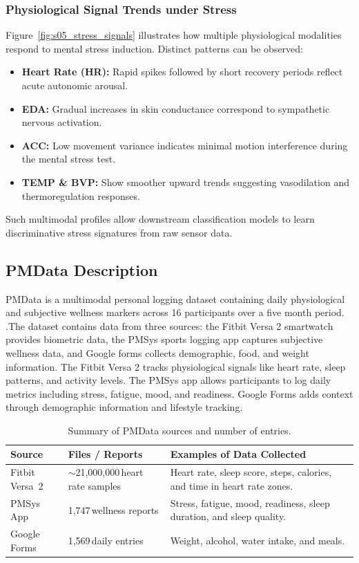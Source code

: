 \documentclass[12pt,letterpaper]{article}
\begin{document}
\subsubsection{Physiological Signal Trends under Stress}
Figure~\ref{fig:s05_stress_signals} illustrates how multiple physiological modalities respond to mental stress induction.
Distinct patterns can be observed:
\begin{itemize}
    \item \textbf{Heart Rate (HR):} Rapid spikes followed by short recovery periods reflect acute autonomic arousal.
    \item \textbf{EDA:} Gradual increases in skin conductance correspond to sympathetic nervous activation.
    \item \textbf{ACC:} Low movement variance indicates minimal motion interference during the mental stress test.
    \item \textbf{TEMP \& BVP:} Show smoother upward trends suggesting vasodilation and thermoregulation responses.
\end{itemize}
Such multimodal profiles allow downstream classification models to learn discriminative stress signatures from raw sensor data.






\subsection{PMData Description}
PMData is a multimodal personal logging dataset containing daily physiological and subjective wellness markers across 16 participants over a five month period. \citep{thambawita2020pmdata}.The dataset contains data from three sources: the Fitbit Versa 2 smartwatch provides biometric data, the PMSys sports logging app captures subjective wellness data, and Google forms collects demographic, food, and weight information. The Fitbit Versa 2 tracks physiological signals like heart rate, sleep patterns, and activity levels. The PMSys app allows participants to log daily metrics including stress, fatigue, mood, and readiness. Google Forms adds context through demographic information and lifestyle tracking. 

\begin{table}[H]
\centering
\renewcommand{\arraystretch}{1.2} 
\setlength{\tabcolsep}{6pt} 
\caption{Summary of PMData sources and number of entries.}
\label{tab:pmdata-summary}
\begin{tabular}{p{3.5cm}p{4cm}p{6.5cm}}
\toprule
\textbf{Source} & \textbf{Files / Reports} & \textbf{Examples of Data Collected} \\
\midrule
Fitbit Versa~2 & $\sim$21{,}000{,}000\,heart rate samples & Heart rate, sleep score, steps, calories, and time in heart rate zones. \\
PMSys App & 1{,}747\,wellness reports & Stress, fatigue, mood, readiness, sleep duration, and sleep quality. \\
Google Forms & 1{,}569\,daily entries & Weight, alcohol, water intake, and meals. \\
\bottomrule
\end{tabular}
\end{table}
\end{document}
